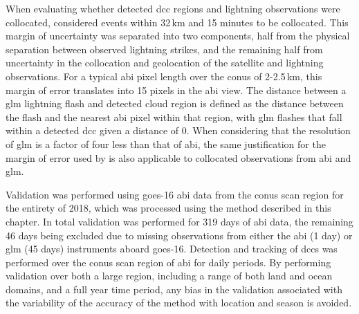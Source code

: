 When evaluating whether detected \acrshort{dcc} regions and lightning observations were collocated, \citet{muller_novel_2019} considered events within 32\,\unit{km} and 15 minutes to be collocated.
This margin of uncertainty was separated into two components, half from the physical separation between observed lightning strikes, and the remaining half from uncertainty in the collocation and geolocation of the satellite and lightning observations.
For a typical \acrshort{abi} pixel length over the \acrshort{conus} of 2-2.5\,\unit{km}, this margin of error translates into 15 pixels in the \acrshort{abi} view.
The distance between a \acrshort{glm} lightning flash and detected cloud region is defined as the distance between the flash and the nearest \acrshort{abi} pixel within that region, with \acrshort{glm} flashes that fall within a detected \acrshort{dcc} given a distance of 0.
When considering that the resolution of \acrshort{glm} is a factor of four less than that of \acrshort{abi}, the same justification for the margin of error used by \citet{muller_novel_2019} is also applicable to collocated observations from \acrshort{abi} and \acrshort{glm}.

Validation was performed using \acrshort{goes}-16 \acrshort{abi} data from the \acrshort{conus} scan region for the entirety of 2018, which was processed using the method described in this chapter.
In total validation was performed for 319 days of \acrshort{abi} data, the remaining 46 days being excluded due to missing observations from either the \acrshort{abi} (1 day) or \acrshort{glm} (45 days) instruments aboard \acrshort{goes}-16.
Detection and tracking of \acrshort{dcc}s was performed over the \acrshort{conus} scan region of \acrshort{abi} for daily periods. 
By performing validation over both a large region, including a range of both land and ocean domains, and a full year time period, any bias in the validation associated with the variability of the accuracy of the method with location and season is avoided.

